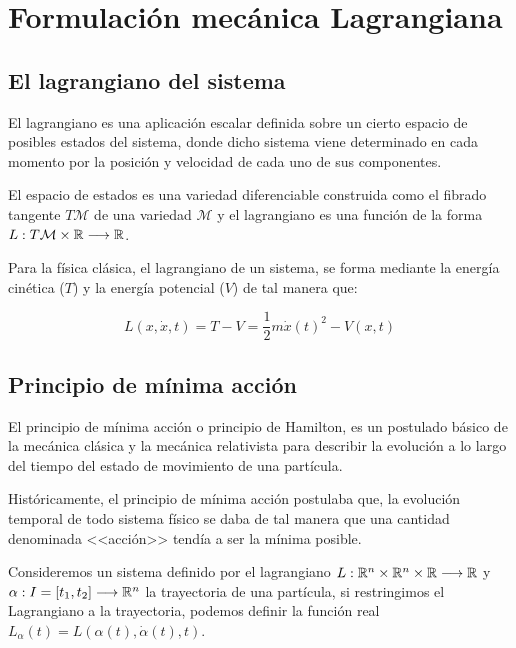 \chapter{Formulación mecánica Lagrangiana}


\section{El lagrangiano del sistema}

El lagrangiano es una aplicación escalar definida sobre un cierto espacio de posibles estados del sistema, donde dicho sistema viene determinado en cada momento por la posición y velocidad de cada uno de sus componentes.

El espacio de estados es una variedad diferenciable construida como el fibrado tangente $T\mathcal{M}$ de una variedad $\mathcal{M}$ y el lagrangiano es una función de la forma $L:T\mathcal{M}\times\mathbb{R}\longrightarrow \mathbb{R}$.

Para la física clásica, el lagrangiano de un sistema, se forma mediante la energía cinética ($T$) y la energía potencial ($V$) de tal manera que:
\begin{postulate}
    \begin{equation}
        \label{eq:lagrangiano_clasico}
        L(x,\dot{x},t)=T-V=\frac{1}{2}m\dot{x}(t)^2-V(x,t)
    \end{equation}
\end{postulate}


\section{Principio de mínima acción}

El principio de mínima acción o principio de Hamilton, es un postulado básico de la mecánica clásica y la mecánica relativista para describir la evolución a lo largo del tiempo del estado de movimiento de una partícula.

Históricamente, el principio de mínima acción postulaba que, la evolución temporal de todo sistema físico se daba de tal manera que una cantidad denominada <<acción>> tendía a ser la mínima posible.

Consideremos un sistema definido por el lagrangiano $L:\mathbb{R}^n\times\mathbb{R}^n\times\mathbb{R}\longrightarrow \mathbb{R}$ y $\alpha:I=[t_1, t_2]\longrightarrow \mathbb{R}^n$ la trayectoria de una partícula, si restringimos el Lagrangiano a la trayectoria, podemos definir la función real $L_\alpha(t)=L(\alpha(t), \dot{\alpha}(t), t)$.

